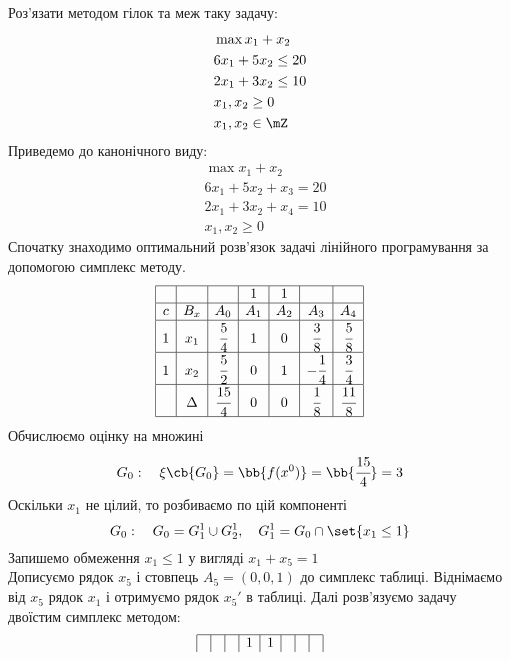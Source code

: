 \begin{exs}\label{exs:pr:2}
Роз’язати методом гілок та меж таку задачу:
\begin{eqnarray}
	&\max x_1+x_2\\
	&6x_1+5x_2 \leq 20\\
	&2x_1+3x_2\leq 10 \\
	&x_1,x_2\geq 0\\
	&x_1,x_2\in\mZ
\end{eqnarray}
Приведемо до канонічного виду:
\begin{eqnarray}
	&\max x_1 + x_2 \\
	&6x_1 + 5x_2 + x_3 = 20\\
	&2x_1 + 3x_2 + x_4 = 10\\
	&x_1,x_2\geq 0
\end{eqnarray}
Спочатку знаходимо оптимальний розв’язок задачі лінійного програмування за допомогою симплекс методу. 
\begin{equation}
	\begin{array}{|c|c|c|c|c|c|c|}
		\hline
		  &     &     & 1   & 1   &     & \\
		\hline
		c & B_x & A_0 & A_1 & A_2 & A_3 & A_4 \\
		\hline
		1 & x_1 & \cfrac54 & 1 & 0 & \cfrac38 & \cfrac58\\
		\hline
		1 & x_2 & \cfrac52 & 0 & 1 & -\cfrac14 & \cfrac34\\
		\hline
		& \Delta & \cfrac{15}4& 0 & 0 & \cfrac18 & \cfrac{11}8\\
		\hline
	\end{array}
\end{equation}
Обчислюємо оцінку на множині
\begin{equation}
	G_0:\quad \xi\cb{G_0} = \bb{f(x^0)} = \bb{\cfrac{15}4} = 3
\end{equation}
Оскільки $x_1$ не цілий, то розбиваємо по цій компоненті 
\begin{equation}
	G_0:\quad G_0 = G^1_1\cup G_2^1,\quad G_1^1 = G_0 \cap \set{x_1\leq 1}
\end{equation}
Запишемо обмеження $x_1\leq 1$ у вигляді $x_1+x_5=1$\\
Дописуємо рядок $x_5$ і стовпець $A_5=(0,0,1)$ до симплекс таблиці. Віднімаємо від $x_5$ рядок $x_1$ і отримуємо рядок $x_5'$ в таблиці. Далі розв’язуємо задачу двоїстим симплекс методом:
\begin{equation}
	\begin{array}{|c|c|c|c|c|c|c|c|}
		\hline
		  &     &     & 1   & 1   &     &  &\\

\end{array}
\end{equation}
\end{exs}
